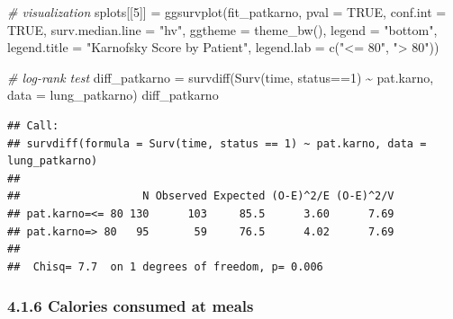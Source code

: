 \documentclass[
]{article}
\newenvironment{Shaded}{\begin{snugshade}}{\end{snugshade}}
\newcommand{\AttributeTok}[1]{\textcolor[rgb]{0.77,0.63,0.00}{#1}}
\newcommand{\CommentTok}[1]{\textcolor[rgb]{0.56,0.35,0.01}{\textit{#1}}}
\newcommand{\ConstantTok}[1]{\textcolor[rgb]{0.00,0.00,0.00}{#1}}
\newcommand{\DecValTok}[1]{\textcolor[rgb]{0.00,0.00,0.81}{#1}}
\newcommand{\FunctionTok}[1]{\textcolor[rgb]{0.00,0.00,0.00}{#1}}
\newcommand{\NormalTok}[1]{#1}
\newcommand{\OtherTok}[1]{\textcolor[rgb]{0.56,0.35,0.01}{#1}}
\newcommand{\SpecialCharTok}[1]{\textcolor[rgb]{0.00,0.00,0.00}{#1}}
\newcommand{\StringTok}[1]{\textcolor[rgb]{0.31,0.60,0.02}{#1}}
\begin{document}
\begin{Shaded}
\begin{Highlighting}[]
\CommentTok{\# visualization}
\NormalTok{splots[[}\DecValTok{5}\NormalTok{]] }\OtherTok{=} \FunctionTok{ggsurvplot}\NormalTok{(fit\_patkarno,}
                         \AttributeTok{pval =} \ConstantTok{TRUE}\NormalTok{, }\AttributeTok{conf.int =} \ConstantTok{TRUE}\NormalTok{,}
                         \AttributeTok{surv.median.line =} \StringTok{"hv"}\NormalTok{, }
                         \AttributeTok{ggtheme =} \FunctionTok{theme\_bw}\NormalTok{(), }
                         \AttributeTok{legend =} \StringTok{"bottom"}\NormalTok{, }
                         \AttributeTok{legend.title =} \StringTok{"Karnofsky Score by Patient"}\NormalTok{,}
                         \AttributeTok{legend.lab =} \FunctionTok{c}\NormalTok{(}\StringTok{"\textless{}= 80"}\NormalTok{, }\StringTok{"\textgreater{} 80"}\NormalTok{))}

\CommentTok{\# log{-}rank test}
\NormalTok{diff\_patkarno }\OtherTok{=} \FunctionTok{survdiff}\NormalTok{(}\FunctionTok{Surv}\NormalTok{(time, status}\SpecialCharTok{==}\DecValTok{1}\NormalTok{) }\SpecialCharTok{\textasciitilde{}}\NormalTok{ pat.karno, }\AttributeTok{data =}\NormalTok{ lung\_patkarno) }
\NormalTok{diff\_patkarno}
\end{Highlighting}
\end{Shaded}

\begin{verbatim}
## Call:
## survdiff(formula = Surv(time, status == 1) ~ pat.karno, data = lung_patkarno)
## 
##                   N Observed Expected (O-E)^2/E (O-E)^2/V
## pat.karno=<= 80 130      103     85.5      3.60      7.69
## pat.karno=> 80   95       59     76.5      4.02      7.69
## 
##  Chisq= 7.7  on 1 degrees of freedom, p= 0.006
\end{verbatim}

\hypertarget{calories-consumed-at-meals}{%
\subsubsection{4.1.6 Calories consumed at
meals}\label{calories-consumed-at-meals}}
\end{document}
